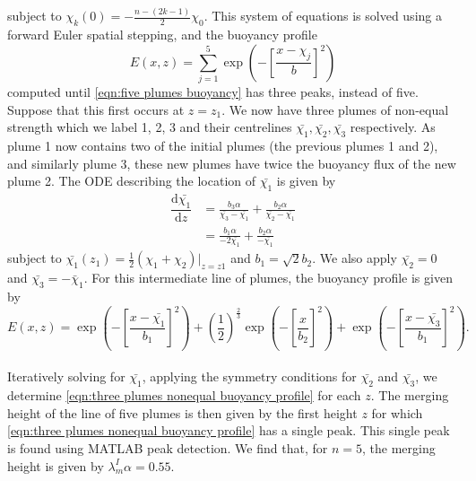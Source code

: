 \documentclass{jfm}
\newcommand{\dbyd}[2]{\dfrac{\mathrm{d} #1}{\mathrm{d}#2}} %
\begin{document}
	subject to $\chi_k(0) = -\frac{n-(2k-1)}{2}\chi_0$. This system of equations is solved using a forward Euler spatial stepping, and the buoyancy profile
	\begin{equation}
		E(x,z) = \sum_{j=1}^{5}\exp\left(-\left[\frac{x-\chi_j}{b}\right]^2\right)\label{eqn:five plumes buoyancy}
	\end{equation}
	computed until \eqref{eqn:five plumes buoyancy} has three peaks, instead of five. Suppose that this first occurs at $z = z_1$. We now have three plumes of non-equal strength which we label 1, 2, 3 and their centrelines $\bar{\chi_1}, \bar{\chi_2}, \bar{\chi_3}$ respectively. As plume 1 now contains two of the initial plumes (the previous plumes 1 and 2), and similarly plume 3, these new plumes have twice the buoyancy flux of the new plume 2. The ODE describing the location of $\bar{\chi_1}$ is given by
	\begin{align}
		\dbyd{\bar{\chi_1}}{z} &= \frac{b_3\alpha}{\bar{\chi_3}-\bar{\chi_1}} + \frac{b_2\alpha}{\bar{\chi_2}-\bar{\chi_1}} \\
		&= \frac{b_1\alpha}{-2\bar{\chi_1}} + \frac{b_2\alpha}{-\bar{\chi_1}}
	\end{align}
	subject to $\bar{\chi_1}(z_1) = \frac{1}{2}\left(\chi_1 + \chi_2\right)\vert_{z=z1}$ and $b_1 = \sqrt{2}b_2$. We also apply $\bar{\chi_2} = 0$ and $\bar{\chi_3} = -\bar{\chi}_1$. For this intermediate line of plumes, the buoyancy profile is given by
	\begin{equation}
		E(x,z) = \exp\left(-\left[\frac{x-\bar{\chi_1}}{b_1}\right]^2\right)
		+ \left(\frac{1}{2}\right)^{\frac{2}{3}}\exp\left(-\left[\frac{x}{b_2}\right]^2\right)
		+ \exp\left(-\left[\frac{x-\bar{\chi_3}}{b_1}\right]^2\right). \label{eqn:three plumes nonequal buoyancy profile}
	\end{equation}
	\\
	\noindent Iteratively solving for $\bar{\chi_1}$, applying the symmetry conditions for $\bar{\chi_2}$ and $\bar{\chi_3}$, we determine \eqref{eqn:three plumes nonequal buoyancy profile} for each $z$. The merging height of the line of five plumes is then given by the first height $z$ for which \eqref{eqn:three plumes nonequal buoyancy profile} has a single peak. This single peak is found using MATLAB peak detection. We find that, for $n = 5$, the merging height is given by $\lambda_m^I \alpha = 0.55$.
\end{document}
